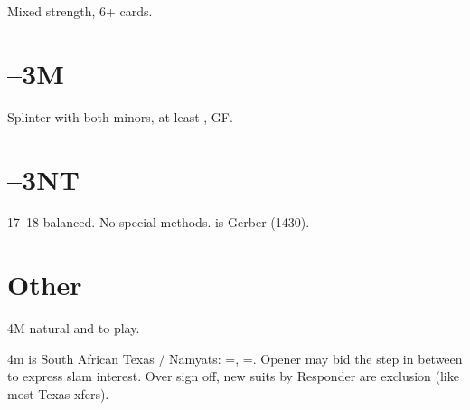 \documentclass[tom-jenni]{subfiles}
\begin{document}
Mixed strength, 6+ cards.

\section[1D--3M]{--3M}

Splinter with both minors, at least , GF.

\section[1D--3NT]{--3NT}

17--18 balanced. No special methods.  is Gerber (1430).

\section{Other}

4M natural and to play.

4m is South African Texas / Namyats:  =\hhh, =\sss.  Opener may bid the step in between to express slam interest.  Over sign off, new suits by Responder are exclusion (like most Texas xfers).   
\end{document}

